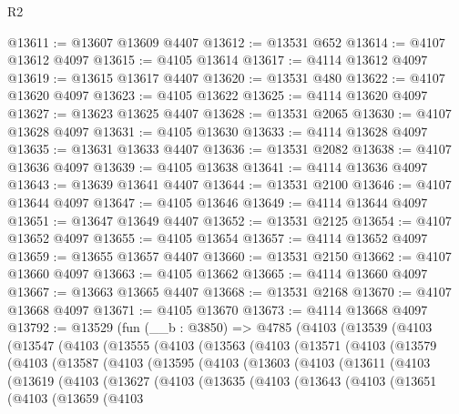 \begin{lexlean}{R2}
\begin{coremodule}
@13611 := @13607 @13609 @4407
@13612 := @13531 @652
@13614 := @4107 @13612 @4097
@13615 := @4105 @13614
@13617 := @4114 @13612 @4097
@13619 := @13615 @13617 @4407
@13620 := @13531 @480
@13622 := @4107 @13620 @4097
@13623 := @4105 @13622
@13625 := @4114 @13620 @4097
@13627 := @13623 @13625 @4407
@13628 := @13531 @2065
@13630 := @4107 @13628 @4097
@13631 := @4105 @13630
@13633 := @4114 @13628 @4097
@13635 := @13631 @13633 @4407
@13636 := @13531 @2082
@13638 := @4107 @13636 @4097
@13639 := @4105 @13638
@13641 := @4114 @13636 @4097
@13643 := @13639 @13641 @4407
@13644 := @13531 @2100
@13646 := @4107 @13644 @4097
@13647 := @4105 @13646
@13649 := @4114 @13644 @4097
@13651 := @13647 @13649 @4407
@13652 := @13531 @2125
@13654 := @4107 @13652 @4097
@13655 := @4105 @13654
@13657 := @4114 @13652 @4097
@13659 := @13655 @13657 @4407
@13660 := @13531 @2150
@13662 := @4107 @13660 @4097
@13663 := @4105 @13662
@13665 := @4114 @13660 @4097
@13667 := @13663 @13665 @4407
@13668 := @13531 @2168
@13670 := @4107 @13668 @4097
@13671 := @4105 @13670
@13673 := @4114 @13668 @4097
@13792 := @13529
    (fun (__b : @3850) =>
    @4785
      (@4103
        (@13539
          (@4103
            (@13547
              (@4103
                (@13555
                  (@4103
                    (@13563
                      (@4103
                        (@13571
                          (@4103
                            (@13579
                              (@4103
                                (@13587
                                  (@4103
                                    (@13595
                                      (@4103
                                        (@13603
                                          (@4103
                                            (@13611
                                              (@4103
                                                (@13619
                                                  (@4103
                                                    (@13627
                                                      (@4103
                                                        (@13635
                                                          (@4103
                                                            (@13643
                                                              (@4103
                                                                (@13651
                                                                  (@4103
                                                                    (@13659
                                                                      (@4103

\end{coremodule}
\end{lexlean}
